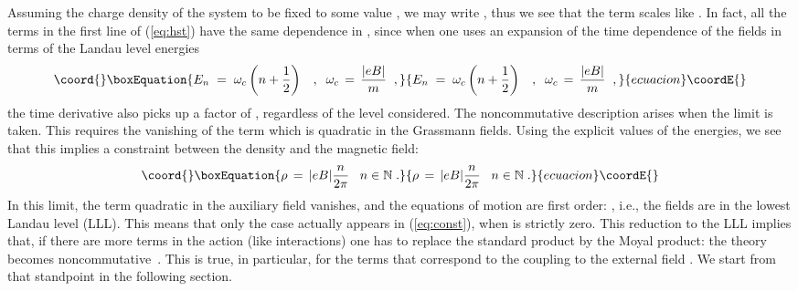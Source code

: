 \documentclass[a4paper,12pt]{article}
\begin{document}
Assuming the charge density of the system to be fixed to some value
\myHighlight{$\rho$}\coordHE{}, we may write \coordHE{}, thus we see that the \coordHE{} term scales like \coordHE{}.  In fact, all the terms in the first
line of (\ref{eq:hst}) have the same dependence in \coordHE{}, since when one
uses an expansion of the time dependence of the fields in terms of the
Landau level energies
\begin{equation}\coord{}\boxEquation{
E_n \;=\;  \omega_c \left(n+\frac{1}{2}\right) \;\;\;,\;\; \omega_c \,=\, \frac{|e B|}{m }\;\;, 
}{
E_n \;=\;  \omega_c \left(n+\frac{1}{2}\right) \;\;\;,\;\; \omega_c \,=\, \frac{|e B|}{m }\;\;, 
}{ecuacion}\coordE{}\end{equation}
the time derivative also picks up a factor of \coordHE{}, regardless of
the level considered. The noncommutative description arises when the
\coordHE{} limit is taken.  This requires the vanishing of the term 
which
is quadratic in the Grassmann fields. Using the explicit values of the
energies, we see that this implies a constraint between the density
and the magnetic field:
\begin{equation}\coord{}\boxEquation{
  \label{eq:const}
\rho \,=\, |e B|\frac{n}{ 2\pi}  \;\;\; n \in {\mathbb N} \;. 
}{
  \rho \,=\, |e B|\frac{n}{ 2\pi}  \;\;\; n \in {\mathbb N} \;. 
}{ecuacion}\coordE{}\end{equation}  
In this limit, the term quadratic in the auxiliary field vanishes, and
the equations of motion are first order: \coordHE{}, i.e., the fields
are in the lowest Landau level (LLL). This means that only the \coordHE{}
case actually appears in (\ref{eq:const}), when \coordHE{} is strictly zero.
This reduction to the LLL implies that, if there are more terms in the
action (like interactions) one has to replace the standard product by
the Moyal product: the theory becomes noncommutative~\cite{cesarana}.
This is true, in particular, for the terms that correspond to the
coupling to the external field \coordHE{}. We start from that
standpoint in the following section.
\end{document}
